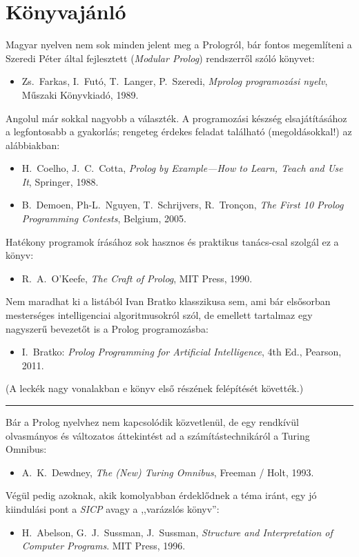 \chapter{Könyvajánló}
Magyar nyelven nem sok minden jelent meg a Prologról, bár fontos
megemlíteni a Szeredi Péter által fejlesztett 
(\emph{Modular Prolog}) rendszerről szóló
könyvet:
\begin{itemize}
\item[] Zs.~Farkas, I.~Futó, T.~Langer, P.~Szeredi, \emph{Mprolog
programozási nyelv}, Műszaki Könyvkiadó, 1989.
\end{itemize}
Angolul már sokkal nagyobb a választék. A programozási készség
elsajátításához a legfontosabb a gyakorlás; rengeteg érdekes feladat
található (megoldásokkal!) az alábbiakban:
\begin{itemize}
\item[] H.~Coelho, J.~C.~Cotta, \emph{Prolog by Example---How to Learn, Teach and Use It}, Springer, 1988.
\item[] B.~Demoen, Ph-L.~Nguyen, T.~Schrijvers, R.~Tron\c con, \emph{The First 10 Prolog Programming Contests}, Belgium, 2005.
\end{itemize}
Hatékony programok írásához sok hasznos és praktikus tanács-csal szolgál ez a könyv:
\begin{itemize}
\item[] R.~A.~O'Keefe, \emph{The Craft of Prolog}, MIT Press, 1990.
\end{itemize}
Nem maradhat ki a listából Ivan Bratko klasszikusa sem,
ami bár elsősorban mesterséges intelligenciai algoritmusokról szól, de emellett
tartalmaz egy nagyszerű bevezetőt is a Prolog programozásba:
\begin{itemize}
\item[] I.~Bratko: \emph{Prolog Programming for Artificial Intelligence}, 4th Ed., Pearson, 2011.
\end{itemize}
(A leckék nagy vonalakban e könyv első részének felépítését követték.)

\bigskip
\begin{center}
\rule{0.5\textwidth}{.5pt}
\end{center}
\bigskip

Bár a Prolog nyelvhez nem kapcsolódik közvetlenül, de egy rendkívül
olvasmányos és változatos áttekintést ad a számítástechnikáról a
Turing Omnibus:
\begin{itemize}
\item[] A.~K.~Dewdney, \emph{The (New) Turing Omnibus}, Freeman / Holt, 1993.
\end{itemize}
Végül pedig azoknak, akik komolyabban érdeklődnek a téma iránt, egy jó
kiindulási pont a \emph{SICP} avagy a ,,varázslós könyv'':
\begin{itemize}
\item[] H.~Abelson, G.~J.~Sussman, J.~Sussman, \emph{Structure and Interpretation of Computer Programs}. MIT Press, 1996.
\end{itemize}
